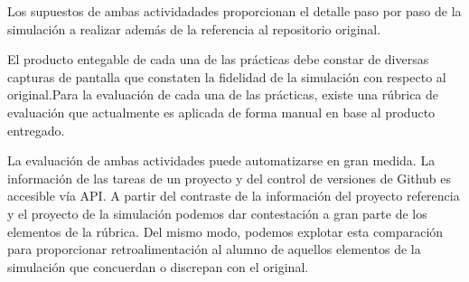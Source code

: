 Los supuestos de ambas actividadades proporcionan el  detalle paso por paso de la simulación a realizar además de la referencia al repositorio original. 


El producto entegable de cada una de las prácticas debe constar de diversas capturas de pantalla que constaten la fidelidad de la simulación con respecto al original.Para la evaluación de cada una de las prácticas, existe una rúbrica de evaluación que actualmente es aplicada de forma manual en base al producto entregado.


La evaluación de ambas actividades puede automatizarse en gran medida. La información de las tareas de un proyecto y del control de versiones de Github es accesible vía API. A partir del contraste de la información del proyecto referencia y el proyecto de la simulación podemos dar contestación a gran parte de los elementos de la rúbrica. Del mismo modo, podemos explotar esta comparación para proporcionar retroalimentación al alumno de aquellos elementos de la simulación que concuerdan o discrepan con el original.


